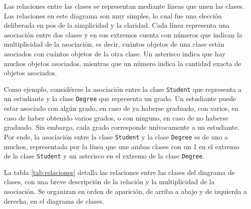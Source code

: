 Las relaciones entre las clases se representan mediante líneas que unen las clases. Las relaciones en este diagrama son muy simples, lo cual fue una elección deliberada en pos de la simplicidad y la claridad. Cada línea representa una asociación entre dos clases y en sus extremos cuenta con números que indican la multiplicidad de la asociación, es decir, cuántos objetos de una clase están asociados con cuántos objetos de la otra clase. Un asterisco indica que hay muchos objetos asociados, mientras que un número indica la cantidad exacta de objetos asociados.

Como ejemplo, considérese la asociación entre la clase \lstinline|Student| que representa a un estudiante y la clase \lstinline|Degree| que representa un grado. Un estudiante puede estar asociado con algún grado, en caso de ya haberse graduado, con varios, en caso de haber obtenido varios grados, o con ninguno, en caso de no haberse graduado. Sin embargo, cada grado corresponde unívocamente a un estudiante. Por ende, la asociación entre la clase \lstinline|Student| y la clase \lstinline|Degree| es de uno a muchos, representada por la línea que une ambas clases con un 1 en el extremo de la clase \lstinline|Student| y un asterisco en el extremo de la clase \lstinline|Degree|.

La tabla \ref{tab:relaciones} detalla las relaciones entre las clases del diagrama de clases, con una breve descripción de la relación y la multiplicidad de la asociación. Se organizan en orden de aparición, de arriba a abajo y de izquierda a derecha, en el diagrama de clases.


